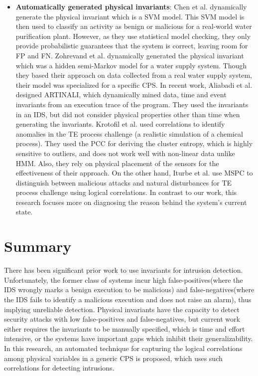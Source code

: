 \begin{itemize}
\item \textbf{Automatically generated physical invariants}: Chen et al. \cite{chen2018learning} dynamically generate the physical invariant which is a \ac{SVM} model. This \ac{SVM} model is then used to classify an activity as benign or malicious for a real-world water purification plant. However, as they use statistical model checking, they only provide probabilistic guarantees that the system is correct, leaving room for \acf{FP} and \acf{FN}. Zohrevand et al. \cite{zohrevand2016hidden} dynamically generated the physical invariant which was a hidden semi-Markov model for a water supply system. Though they based their approach on  data collected from a real water supply system, their model was specialized for a specific \ac{CPS}. In recent work, Aliabadi et al. \cite{aliabadi2017artinali} designed ARTINALI, which dynamically mined data, time and event invariants from an execution trace of the program. They used the invariants in an \ac{IDS}, but did not consider physical properties other than time when generating the invariants. Krotofil et al. \cite{krotofil2015process} used correlations to identify anomalies in the \ac{TE} process challenge (a realistic simulation of a chemical process). They used the \acf{PCC} for deriving the cluster entropy, which is highly sensitive to outliers, and does not work well with non-linear data unlike \ac{HMM}. Also, they rely on physical placement of the sensors for the effectiveness of their approach. On the other hand, Iturbe et al. \cite{iturbe2017feasibility} use \ac{MSPC} to distinguish between malicious attacks and natural disturbances for \ac{TE} process challenge using logical correlations. In contrast to our work, this research focuses more on diagnosing the reason behind the system's current state. 
\end{itemize}

\section{Summary}
There has been significant prior work to use invariants for intrusion detection. Unfortunately, the former class of systems incur high false-positives(where the IDS wrongly marks a benign execution to be malicious) and false-negatives(where the IDS fails to identify a malicious execution and does not raise an alarm), thus implying unreliable detection. Physical invariants have the capacity to detect security attacks with low false-positives and false-negatives, but current work either requires the invariants to be manually specified, which is time and effort intensive, or the systems have important gaps which inhibit their generalizability. In this research, an automated technique for capturing the logical correlations among physical variables in a generic \ac{CPS} is proposed, which uses such correlations for detecting intrusions.

\endinput
